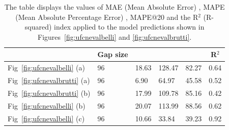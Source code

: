 \begin{table}[H]
	\begin{center}
		\begin{tabular}[c]{l|l|l|l|l|l}
			\multicolumn{1}{c|}{\textbf{}}            &
			\multicolumn{1}{c|}{\textbf{Gap size}}    &
			\makecell{\textbf{MAE} \textbf{(kW)}}     &
			\makecell{\textbf{MAPE} \textbf{(\%)}}    &
			\makecell{\textbf{MAPE@20} \textbf{(\%)}} &
			\multicolumn{1}{c}{\textbf{R}$^2$}                                             \\
			\hline
			Fig~\ref{fig:ufcnevalbelli} (a)           & 96 & 18.63 & 128.47 & 82.27 & 0.64 \\
			Fig~\ref{fig:ufcnevalbrutti} (a)          & 96 & 6.90  & 64.97  & 45.58 & 0.52 \\
			Fig~\ref{fig:ufcnevalbrutti} (b)          & 96 & 17.99 & 109.78 & 85.16 & 0.42 \\
			Fig~\ref{fig:ufcnevalbelli} (b)           & 96 & 20.07 & 113.99 & 88.56 & 0.62 \\
			Fig~\ref{fig:ufcnevalbelli} (c)           & 96 & 10.66 & 33.84  & 39.23 & 0.92
		\end{tabular}
	\end{center}
	\caption{The table displays the values of MAE (Mean Absolute Error) \cite{metrics}, MAPE (Mean Absolute Percentage Error) \cite{metrics}, MAPE@20 and the R$^2$ (R-squared) \cite{metrics} index applied to the model predictions shown in Figures~\ref{fig:ufcnevalbelli} and \ref{fig:ufcnevalbrutti}.}\label{tab:ufcnndatitab1}
\end{table}

